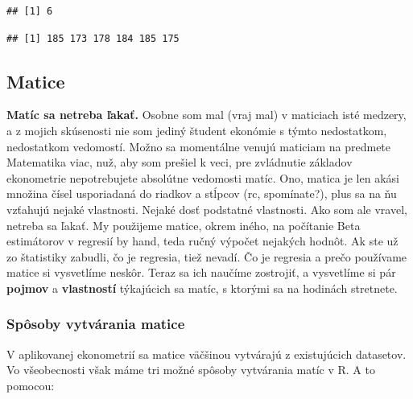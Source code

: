 \begin{verbatim}
## [1] 6
\end{verbatim}

\begin{Shaded}
\begin{Highlighting}[]

\StringTok{ }\NormalTok{vyska[vyska }\OperatorTok{>}\StringTok{ }\NormalTok{]}

\end{Highlighting}
\end{Shaded}

\begin{verbatim}
## [1] 185 173 178 184 185 175
\end{verbatim}

\hypertarget{matice}{%
\subsection{Matice}\label{matice}}

\textbf{Matíc sa netreba ľakať.} Osobne som mal (vraj mal) v maticiach
isté medzery, a z mojich skúsenosti nie som jediný študent ekonómie s
týmto nedostatkom, nedostatkom vedomostí. Možno sa momentálne venujú
maticiam na predmete Matematika viac, nuž, aby som prešiel k veci, pre
zvládnutie základov ekonometrie nepotrebujete absolútne vedomosti matíc.
Ono, matica je len akási množina čísel usporiadaná do riadkov a stĺpcov
(rc, spomínate?), plus sa na ňu vzťahujú nejaké vlastnosti. Nejaké dosť
podstatné vlastnosti. Ako som ale vravel, netreba sa ľakať. My použijeme
matice, okrem iného, na počítanie Beta estimátorov v regresií by hand,
teda ručný výpočet nejakých hodnôt. Ak ste už zo štatistiky zabudli, čo
je regresia, tiež nevadí. Čo je regresia a prečo používame matice si
vysvetlíme neskôr. Teraz sa ich naučíme zostrojiť, a vysvetlíme si pár
\textbf{pojmov} a \textbf{vlastností} týkajúcich sa matíc, s ktorými sa
na hodinách stretnete.

\hypertarget{spuxf4soby-vytvuxe1rania-matice}{%
\subsubsection{Spôsoby vytvárania
matice}\label{spuxf4soby-vytvuxe1rania-matice}}

V aplikovanej ekonometrií sa matice väčšinou vytvárajú z existujúcich
datasetov. Vo všeobecnosti však máme tri možné spôsoby vytvárania matíc
v R. A to pomocou:

